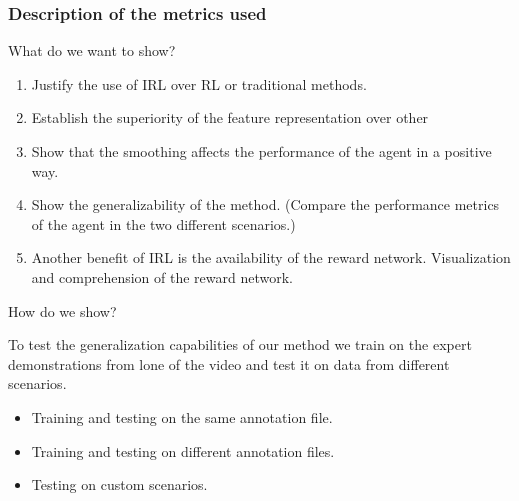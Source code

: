 \subsubsection*{Description of the metrics used}
What do we want to show? 
\begin{enumerate}
	\item Justify the use of IRL over RL or traditional methods.
	\item Establish the superiority of the feature representation over other
	\item Show that the smoothing affects the performance of the agent in a positive way.
	\item Show the generalizability of the method. (Compare the performance metrics of the agent in the two different scenarios.)
	\item Another benefit of IRL is the availability of the reward network. Visualization and comprehension of the reward network. 
\end{enumerate}
How do we show?

To test the generalization capabilities of our method we train on the expert demonstrations from lone of the video and test it on data from different scenarios.

\begin{itemize}
        \item Training and testing on the same annotation file.
        \item Training and testing on different annotation files.
        \item Testing on custom scenarios.
\end{itemize}

